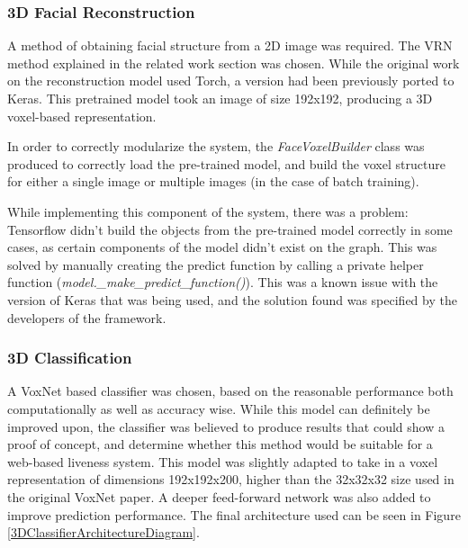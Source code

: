 \documentclass[10pt,a4paper]{article}
\begin{document}
        \subsubsection{3D Facial Reconstruction}
            A method of obtaining facial structure from a 2D image was required. The VRN method explained in the related work section was chosen. \cite{3DReconstructionMethod}
            While the original work on the reconstruction model used Torch, a version had been previously ported to Keras.\cite{VRNTorchToKeras} This pretrained model took an image of size 192x192, producing a 3D voxel-based representation. 

            In order to correctly modularize the system, the \emph{FaceVoxelBuilder} class was produced to correctly load the pre-trained model, and build the voxel structure for either a single image or multiple images (in the case of batch training).

            While implementing this component of the system, there was a problem: Tensorflow didn't build the objects from the pre-trained model correctly in some cases, as certain components of the model didn't exist on the graph. This was solved by manually creating the predict function by calling a private helper function (\emph{model.\_make\_predict\_function()}).
            This was a known issue with the version of Keras that was being used, and the solution found was specified by the developers of the framework. \cite{KerasVoxNetBug}

        \subsubsection{3D Classification}
            A VoxNet based classifier was chosen, based on the reasonable performance both computationally as well as accuracy wise. 
            While this model can definitely be improved upon, the classifier was believed to produce results that could show a proof of concept,
            and determine whether this method would be suitable for a web-based liveness system. This model was slightly adapted to
            take in a voxel representation of dimensions 192x192x200, higher than the 32x32x32 size used in the original VoxNet paper.
            A deeper feed-forward network was also added to improve prediction performance.
            The final architecture used can be seen in Figure \ref{3DClassifierArchitectureDiagram}.
\end{document}

